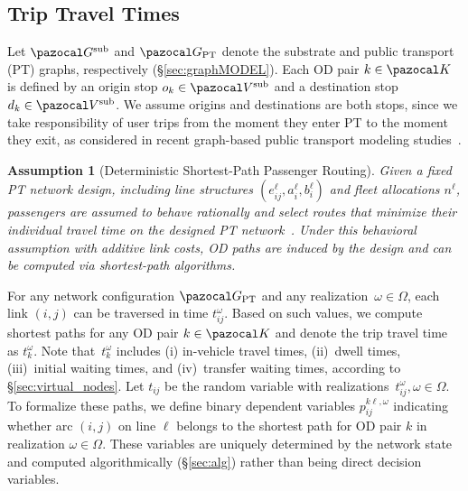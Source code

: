 \documentclass[a4paper,fleqn]{cas-sc}
\newtheorem{assumption}{Assumption}
\begin{document}
\subsection{Trip Travel Times}
\label{sec:trip-travel-times}

Let $\pazocal G^{\text{sub}}$ and $\pazocal G_{\text{PT}}$ denote the substrate and public transport (PT) graphs, respectively (\S\ref{sec:graphMODEL}). Each OD pair $k \in \pazocal K$ is defined by an origin stop $o_k \in \pazocal V^{\text{sub}}$ and a destination stop $d_k \in \pazocal V^{\text{sub}}$.
We assume origins and destinations are both stops, since we take responsibility of user trips from the moment they enter PT to the moment they exit, as considered in recent graph-based public transport modeling studies~\citep{zhao2024origin}.

\begin{assumption}[Deterministic Shortest-Path Passenger Routing]
\label{ass:det_routing}
Given a fixed PT network design, including line structures $(e_{ij}^\ell, a_i^\ell, b_i^\ell)$ and fleet allocations $n^\ell$, passengers are assumed to behave rationally and select routes that minimize their individual travel time on the designed PT network~\citep{goerigk2017line, schobel2022cheapest}.
Under this behavioral assumption with additive link costs, OD paths are induced by the design and can be computed via shortest-path algorithms.
\end{assumption}

For any network configuration $\pazocal G_\text{PT}$ and any realization~$\omega\in\Omega$, each link $(i,j)$ can be traversed in time $t_{ij}^\omega$. Based on such values, we compute shortest paths for any OD pair $k\in\pazocal K$ and denote the trip travel time as $t_k^\omega$. Note that~$t_k^\omega$ includes (i) in-vehicle travel times, (ii)~dwell times, (iii)~initial waiting times, and (iv)~transfer waiting times, according to \S{}\ref{sec:virtual_nodes}. Let $t_{ij}$ be the random variable with realizations~$t_{ij}^\omega,\omega\in\Omega$. 
%
%
To formalize these paths, we define binary dependent variables $p_{ij}^{k\ell,\omega}$ indicating whether arc $(i,j)$ on line $\ell$ belongs to the shortest path for OD pair $k$ in realization $\omega\in\Omega$. These variables are uniquely determined by the network state and computed algorithmically (\S\ref{sec:alg}) rather than being direct decision variables.
\end{document}
